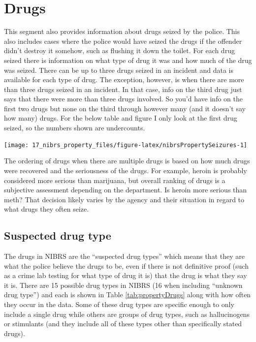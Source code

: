 \documentclass[
]{krantz}
\let\origfigure\figure
\let\endorigfigure\endfigure
\renewenvironment{figure}[1][2] {
    \expandafter\origfigure\expandafter[H]
} {
    \endorigfigure
}
\begin{document}
\section{Drugs}\label{drugs}

This segment also provides information about drugs seized by
the police. This also includes cases where the police would
have seized the drugs if the offender didn't destroy it
somehow, such as flushing it down the toilet. For each drug
seized there is information on what type of drug it was and
how much of the drug was seized. There can be up to three
drugs seized in an incident and data is available for each
type of drug. The exception, however, is when there are more
than three drugs seized in an incident. In that case, info
on the third drug just says that there were more than three
drugs involved. So you'd have info on the first two drugs
but none on the third through however many (and it doesn't
say how many) drugs. For the below table and figure I only
look at the first drug seized, so the numbers shown are
undercounts.

\begin{figure}

{\centering \texttt{[image: 17\_nibrs\_property\_files/figure-latex/nibrsPropertySeizures-1]} 

}

\caption{The annual number of drug seizures reported, 1991-2022.}\label{fig:nibrsPropertySeizures}
\end{figure}

The ordering of drugs when there are multiple drugs is based
on how much drugs were recovered and the seriousness of the
drugs. For example, heroin is probably considered more
serious than marijuana, but overall ranking of drugs is a
subjective assessment depending on the department. Is heroin
more serious than meth? That decision likely varies by the
agency and their situation in regard to what drugs they
often seize.

\subsection{Suspected drug type}\label{suspected-drug-type}

The drugs in NIBRS are the ``suspected drug types'' which
means that they are what the police believe the drugs to be,
even if there is not definitive proof (such as a crime lab
testing for what type of drug it is) that the drug is what
they say it is. There are 15 possible drug types in NIBRS
(16 when including ``unknown drug type'') and each is shown
in Table \ref{tab:propertyDrugs} along with how often they
occur in the data. Some of these drug types are specific
enough to only include a single drug while others are groups
of drug types, such as hallucinogens or stimulants (and they
include all of these types other than specifically stated
drugs).
\end{document}
